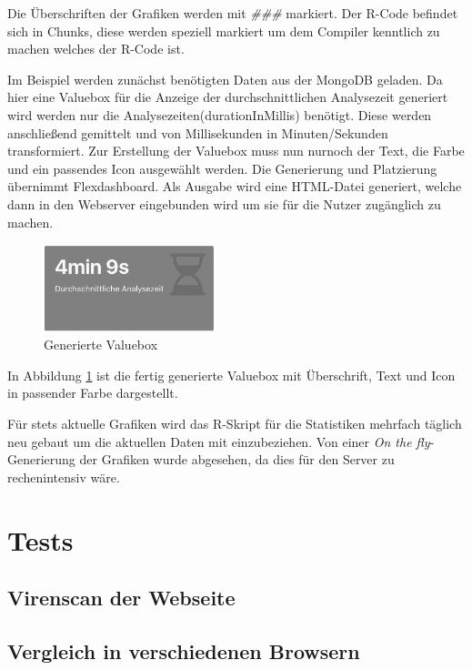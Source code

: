 Die Überschriften der Grafiken werden mit \textit{\#\#\#} markiert. Der R-Code befindet sich in Chunks, diese werden speziell markiert um dem Compiler kenntlich zu machen welches der R-Code ist.

Im Beispiel werden zunächst benötigten Daten aus der MongoDB geladen. Da hier eine Valuebox für die Anzeige der durchschnittlichen Analysezeit generiert wird werden nur die Analysezeiten(durationInMillis) benötigt. Diese werden anschließend gemittelt und von Millisekunden in Minuten/Sekunden transformiert. Zur Erstellung der Valuebox muss nun nurnoch der Text, die Farbe und ein passendes Icon ausgewählt werden. Die Generierung und Platzierung übernimmt Flexdashboard. Als Ausgabe wird eine HTML-Datei generiert, welche dann in den Webserver eingebunden wird um sie für die Nutzer zugänglich zu machen.
\begin{figure}[H]
  \centering
  \includegraphics[width=5cm]{images/stats/valuebox}
  \caption{Generierte Valuebox}
  \label{fig:valuebox}
\end{figure}
In Abbildung \ref{fig:valuebox} ist die fertig generierte Valuebox mit Überschrift, Text und Icon in passender Farbe dargestellt.

Für stets aktuelle Grafiken wird das R-Skript für die Statistiken mehrfach täglich neu gebaut um die aktuellen Daten mit einzubeziehen. Von einer \textit{On the fly}-Generierung der Grafiken wurde abgesehen, da dies für den Server zu rechenintensiv wäre.

\section{Tests}

\subsection{Virenscan der Webseite}


\subsection{Vergleich in verschiedenen Browsern}


